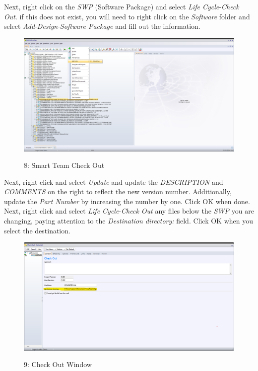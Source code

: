 \documentclass[10pt]{article}
\begin{document}
                Next, right click on the \emph{SWP} (Software Package) and select \emph{Life Cycle}-\emph{Check Out}. if this does not exist, you will need to right click on the \emph{Software} folder and select \emph{Add}-\emph{Design}-\emph{Software Package} and fill out the information.
                \begin{figure}[H]
                    \centerline{\includegraphics[width=\textwidth]{References/ST Check Out.png}}
                    \figurename{ 8: Smart Team Check Out}
                \end{figure}
                Next, right click and select \emph{Update} and update the \emph{DESCRIPTION} and \emph{COMMENTS} on the right to reflect the new version number. Additionally, update the \emph{Part Number} by increasing the number by one. Click OK when done. \\
                Next, right click and select \emph{Life Cycle}-\emph{Check Out} any files below the \emph{SWP} you are changing, paying attention to the \emph{Destination directory:} field. Click OK when you select the destination.
                \begin{figure}[H]
                    \centerline{\includegraphics[width=\textwidth]{References/ST Check Out Window.png}}
                    \figurename{ 9: Check Out Window}
                \end{figure}
\end{document}

